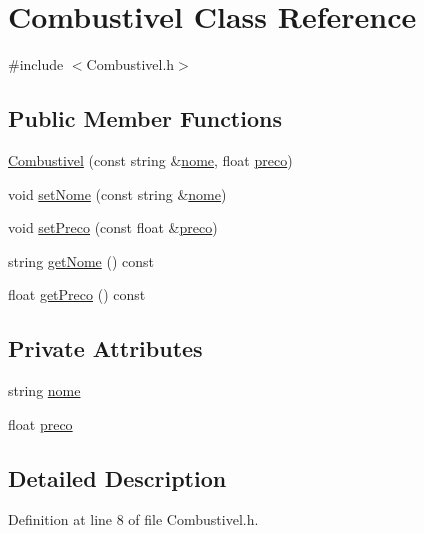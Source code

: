 \hypertarget{class_combustivel}{\section{Combustivel Class Reference}
\label{class_combustivel}
}


{\ttfamily \#include $<$Combustivel.\+h$>$}

\subsection*{Public Member Functions}
\begin{DoxyCompactItemize}
\item 
\hyperlink{class_combustivel_a101e8181fe6c4e21aa3c73cd3888467e}{Combustivel} (const string \&\hyperlink{class_combustivel_adfa329c4c4b60abcb87c1f3c82be4145}{nome}, float \hyperlink{class_combustivel_ac910a8410930ba553861f584da9f48d1}{preco})
\item 
void \hyperlink{class_combustivel_a0f1311345a421884cf290b413e1df9b4}{set\+Nome} (const string \&\hyperlink{class_combustivel_adfa329c4c4b60abcb87c1f3c82be4145}{nome})
\item 
void \hyperlink{class_combustivel_ac0ddd40d9511ca92c5d44a9e4f503d95}{set\+Preco} (const float \&\hyperlink{class_combustivel_ac910a8410930ba553861f584da9f48d1}{preco})
\item 
string \hyperlink{class_combustivel_a20ab48a38371dedfc40ca4b5e11dbb5e}{get\+Nome} () const 
\item 
float \hyperlink{class_combustivel_a7e4bbd943b0534fc2c1fdf3ce6861f14}{get\+Preco} () const 
\end{DoxyCompactItemize}
\subsection*{Private Attributes}
\begin{DoxyCompactItemize}
\item 
string \hyperlink{class_combustivel_adfa329c4c4b60abcb87c1f3c82be4145}{nome}
\item 
float \hyperlink{class_combustivel_ac910a8410930ba553861f584da9f48d1}{preco}
\end{DoxyCompactItemize}


\subsection{Detailed Description}


Definition at line 8 of file Combustivel.\+h.



